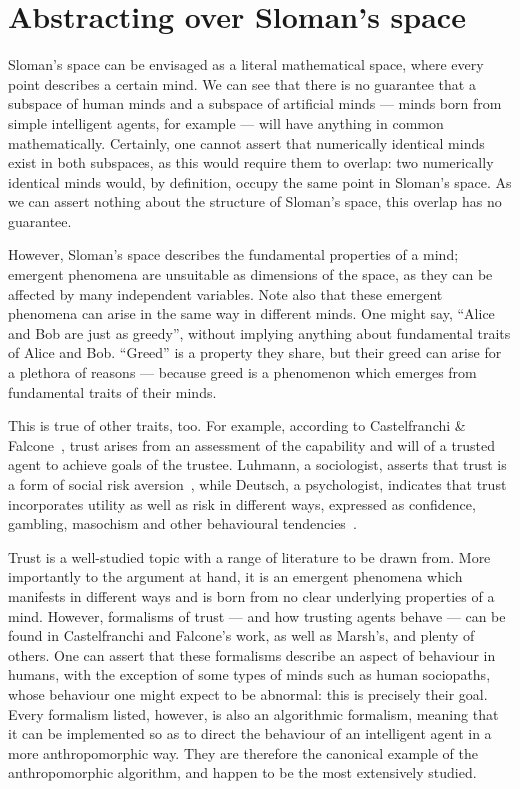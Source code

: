 \section{Abstracting over Sloman's space}
Sloman's space can be envisaged as a literal mathematical space, where every point describes a certain mind. We can see that there is no guarantee that a subspace of human minds and a subspace of artificial minds --- minds born from simple intelligent agents, for example --- will have anything in common mathematically. Certainly, one cannot assert that numerically identical minds exist in both subspaces, as this would require them to overlap: two numerically identical minds would, by definition, occupy the same point in Sloman's space. As we can assert nothing about the structure of Sloman's space, this overlap has no guarantee.\par

However, Sloman's space describes the fundamental properties of a mind; emergent phenomena are unsuitable as dimensions of the space, as they can be affected by many independent variables. Note also that these emergent phenomena can arise in the same way in different minds. One might say, ``Alice and Bob are just as greedy'', without implying anything about fundamental traits of Alice and Bob. ``Greed'' is a property they share, but their greed can arise for a plethora of reasons --- because greed is a phenomenon which emerges from fundamental traits of their minds.\par

This is true of other traits, too. For example, according to Castelfranchi \& Falcone~\citep{CastelfranchiSocialApproach}, trust arises from an assessment of the capability and will of a trusted agent to achieve goals of the trustee. Luhmann, a sociologist, asserts that trust is a form of social risk aversion~\citep{luhmann2000familiarity}, while Deutsch, a psychologist, indicates that trust incorporates utility as well as risk in different ways, expressed as confidence, gambling, masochism and other behavioural tendencies~\citep{deutsch1962cooperation}.\par

Trust is a well-studied topic with a range of literature to be drawn from. More importantly to the argument at hand, it is an emergent phenomena which manifests in different ways and is born from no clear underlying properties of a mind. However, formalisms of trust --- and how trusting agents behave --- can be found in Castelfranchi and Falcone's work, as well as Marsh's, and plenty of others. One can assert that these formalisms describe an aspect of behaviour in humans, with the exception of some types of minds such as human sociopaths, whose behaviour one might expect to be abnormal: this is precisely their goal. Every formalism listed, however, is also an algorithmic formalism, meaning that it can be implemented so as to direct the behaviour of an intelligent agent in a more anthropomorphic way. They are therefore the canonical example of the anthropomorphic algorithm, and happen to be the most extensively studied.\par

